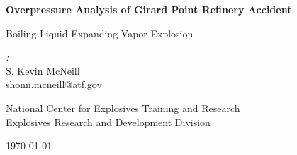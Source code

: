\documentclass[10pt,parskip=half,
toc=sectionentrywithdots,
bibliography=totocnumbered,
captions=tableheading,numbers=noendperiod]{scrartcl}
\begin{document}
    \begin{titlepage}

  \begin{center}

  \vspace*{1cm}

  \Huge\textbf{Overpressure Analysis of Girard Point Refinery Accident}

  \vspace{0.5cm}\LARGE{Boiling-Liquid Expanding-Vapor Explosion}

  \vspace{1.5cm}

  \begin{minipage}{0.8\textwidth}
    \begin{center}
    \begin{minipage}{0.39\textwidth}
    \begin{flushleft} \Large
    \emph{:}\\S. Kevin McNeill\\\href{mailto:shonn.mcneill@atf.gov}{shonn.mcneill@atf.gov}
    \end{flushleft}
    \end{minipage}
    \hspace{\fill}
    \begin{minipage}{0.39\textwidth}
    \begin{flushright} \Large
    \end{flushright}
    \end{minipage}
    \end{center}
  \end{minipage}

  \vfill

  \begin{minipage}{0.8\textwidth}
  \begin{center}
  \end{center}
  \end{minipage}

  \vspace{0.8cm}
      \LARGE{National Center for Explosives Training and Research}\\
      \LARGE{Explosives Research and Development Division}\\

  \vspace{0.4cm}

  \today

  \end{center}
  \end{titlepage}
\end{document}
